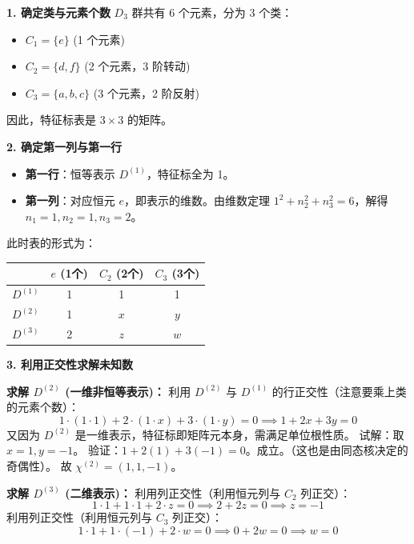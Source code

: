 \textbf{1. 确定类与元素个数}
$D_3$ 群共有 6 个元素，分为 3 个类：
\begin{itemize}
    \item $C_1 = \{e\}$ (1 个元素)
    \item $C_2 = \{d, f\}$ (2 个元素，3 阶转动)
    \item $C_3 = \{a, b, c\}$ (3 个元素，2 阶反射)
\end{itemize}
因此，特征标表是 $3 \times 3$ 的矩阵。

\textbf{2. 确定第一列与第一行}
\begin{itemize}
    \item \textbf{第一行}：恒等表示 $D^{(1)}$，特征标全为 1。
    \item \textbf{第一列}：对应恒元 $e$，即表示的维数。由维数定理 $1^2 + n_2^2 + n_3^2 = 6$，解得 $n_1=1, n_2=1, n_3=2$。
\end{itemize}

此时表的形式为：
\begin{center}
\begin{tabular}{c|ccc}
    & $e$ (1个) & $C_2$ (2个) & $C_3$ (3个) \\
    \hline
    $D^{(1)}$ & 1 & 1 & 1 \\
    $D^{(2)}$ & 1 & $x$ & $y$ \\
    $D^{(3)}$ & 2 & $z$ & $w$ \\
\end{tabular}
\end{center}

\textbf{3. 利用正交性求解未知数}

\textbf{求解 $D^{(2)}$ (一维非恒等表示)：}
利用 $D^{(2)}$ 与 $D^{(1)}$ 的行正交性（注意要乘上类的元素个数）：
\begin{equation}
    1 \cdot (1 \cdot 1) + 2 \cdot (1 \cdot x) + 3 \cdot (1 \cdot y) = 0 \implies 1 + 2x + 3y = 0
\end{equation}
又因为 $D^{(2)}$ 是一维表示，特征标即矩阵元本身，需满足单位根性质。
试解：取 $x=1, y=-1$。
验证：$1 + 2(1) + 3(-1) = 0$。成立。（这也是由同态核决定的奇偶性）。
故 $\chi^{(2)} = (1, 1, -1)$。

\textbf{求解 $D^{(3)}$ (二维表示)：}
利用列正交性（利用恒元列与 $C_2$ 列正交）：
\begin{equation}
    1 \cdot 1 + 1 \cdot 1 + 2 \cdot z = 0 \implies 2 + 2z = 0 \implies z = -1
\end{equation}
利用列正交性（利用恒元列与 $C_3$ 列正交）：
\begin{equation}
    1 \cdot 1 + 1 \cdot (-1) + 2 \cdot w = 0 \implies 0 + 2w = 0 \implies w = 0
\end{equation}

